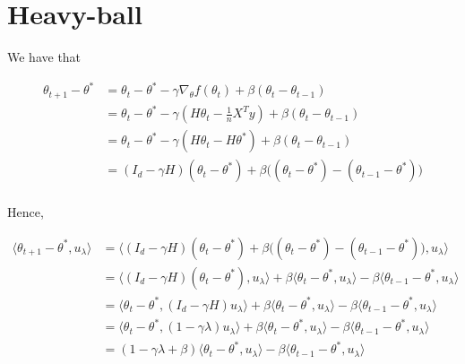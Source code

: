 \documentclass[
10pt, %
a4paper, %
oneside, %
headinclude,footinclude, %
BCOR5mm, %
]{scrartcl}
\title{\normalfont{FTML practical session 13 solution}}
\author{\spacedlowsmallcaps{}
}
\date{\today}
\begin{document}
\renewcommand{\sectionmark}[1]{\markright{\spacedlowsmallcaps{#1}}}
\lehead{\mbox{\llap{\small\thepage\kern1em\color{halfgray} \vline}\color{halfgray}\hspace{0.5em}\rightmark\hfil}} 
\pagestyle{scrheadings}
\maketitle 
\setcounter{tocdepth}{3} 

\section{\large\color{Blue}Heavy-ball}

\exercice{}

We have that 

\begin{equation}
    \begin{aligned}
        \label{eq:}
	\theta_{t+1}- \theta^* &= \theta_{t}- \theta^*- \gamma \nabla_{ \theta}f(\theta_t)+ \beta( \theta_{t}- \theta_{t-1})  \\
	&= \theta_{t}- \theta^*- \gamma ( H \theta_{t}- \frac{1}{n} X^T y)+ \beta( \theta_{t}- \theta_{t-1})  \\
	&= \theta_{t}- \theta^*- \gamma ( H \theta_{t}- H \theta^*)+ \beta( \theta_{t}- \theta_{t-1})  \\
	&= (I_d- \gamma H)(\theta_{t}- \theta^*)+ \beta\Big( (\theta_{t}- \theta^*)- (\theta_{t-1}-\theta^*)\Big)  \\
    \end{aligned}
\end{equation}

Hence,

\begin{equation}
    \begin{aligned}
        \label{eq:}
	\langle \theta_{t+1}- \theta^*, u_{\lambda} \rangle &=     \langle (I_d- \gamma H)(\theta_{t}- \theta^*)+ \beta\Big( (\theta_{t}- \theta^*)- (\theta_{t-1}-\theta^*)\Big), u_{\lambda} \rangle\\
	&= \langle (I_d- \gamma H)(\theta_{t}- \theta^*), u_{\lambda} \rangle+ \beta\langle \theta_{t}- \theta^*, u_{\lambda} \rangle- \beta\langle\theta_{t-1}-\theta^*, u_{\lambda} \rangle\\
	&= \langle \theta_{t}- \theta^*, (I_d- \gamma H)u_{\lambda} \rangle+ \beta\langle \theta_{t}- \theta^*, u_{\lambda} \rangle- \beta\langle\theta_{t-1}-\theta^*, u_{\lambda} \rangle\\
	&= \langle \theta_{t}- \theta^*, (1- \gamma \lambda)u_{\lambda} \rangle+ \beta\langle \theta_{t}- \theta^*, u_{\lambda} \rangle- \beta\langle\theta_{t-1}-\theta^*, u_{\lambda} \rangle\\
	&= (1- \gamma \lambda+ \beta)\langle \theta_{t}- \theta^*, u_{\lambda} \rangle - \beta\langle\theta_{t-1}-\theta^*, u_{\lambda} \rangle\\
    \end{aligned}
\end{equation}
\end{document}
